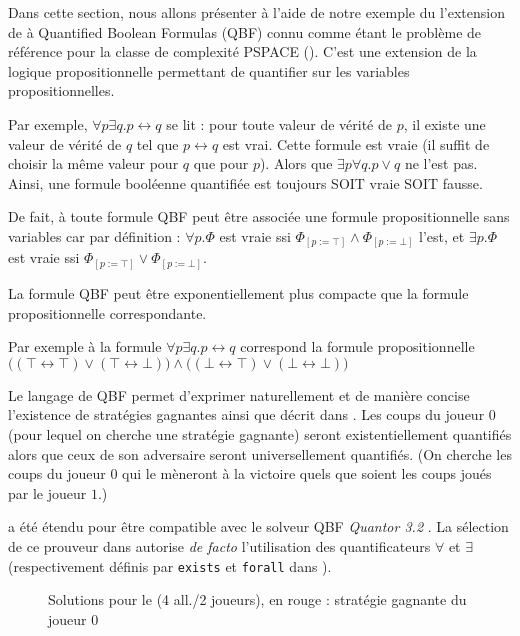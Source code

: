 Dans cette section, nous allons présenter à l'aide de notre exemple du \game l'extension de \touist à Quantified Boolean Formulas (QBF) connu comme étant le problème de référence pour la classe de complexité PSPACE (\cite{Stockmeyer:1973:WPR:800125.804029}). C'est une extension de la logique propositionnelle permettant de quantifier sur les variables propositionnelles. 

Par exemple, $\forall p \exists q.p \leftrightarrow q$ se lit : pour toute valeur de vérité de $p$, il existe une valeur de vérité de $q$ tel que $p \leftrightarrow q$ est vrai. Cette formule est vraie (il suffit de choisir la même valeur pour $q$ que pour $p$). Alors que  $\exists p \forall q.p \lor q$ ne l'est pas. Ainsi, une formule booléenne quantifiée est toujours SOIT vraie SOIT fausse. 

De fait, à toute formule QBF peut être associée une formule propositionnelle sans variables car par définition : 
$\forall p.\Phi$ est vraie ssi $\Phi_{[p:=\top]} \wedge \Phi_{[p:=\bot]}$ l'est, et $\exists p.\Phi$ est vraie ssi $\Phi_{[p:=\top]} \vee \Phi_{[p:=\bot]}$. 

La formule QBF peut être exponentiellement plus compacte que la formule propositionnelle correspondante. 

Par exemple à la formule $\forall p \exists q.p \leftrightarrow q$ correspond la formule propositionnelle \\
$\Big ( (\top \leftrightarrow \top)\vee (\top \leftrightarrow \bot) \Big ) \wedge \Big ( (\bot \leftrightarrow \top)\vee (\bot \leftrightarrow \bot) \Big )$

Le langage de QBF permet d'exprimer naturellement et de manière concise l'existence de stratégies gagnantes ainsi que décrit dans \cite{DBLP:series/txtcs/KroeningS16}. Les coups du joueur 0 (pour lequel on cherche une stratégie gagnante) seront existentiellement quantifiés alors que ceux de son adversaire seront universellement quantifiés. (On cherche les coups du joueur $0$ qui le mèneront à la victoire quels que soient les coups joués par le joueur $1$.)

\touist a été étendu pour être compatible avec le solveur QBF \emph{Quantor 3.2} \cite{Biere:2004:RE:2103144.2103150}. La sélection de ce prouveur dans \touist autorise \emph{de facto} l'utilisation des quantificateurs $\forall$ et $\exists$ (respectivement définis par \verb+exists+ et \verb+forall+ dans \touist).

\begin{figure}
\centering

\caption{Solutions pour le \game (4 all./2 joueurs), en rouge : stratégie gagnante du joueur 0}
\label{fig:solutions}
\vspace{-0.5cm}\end{figure}

